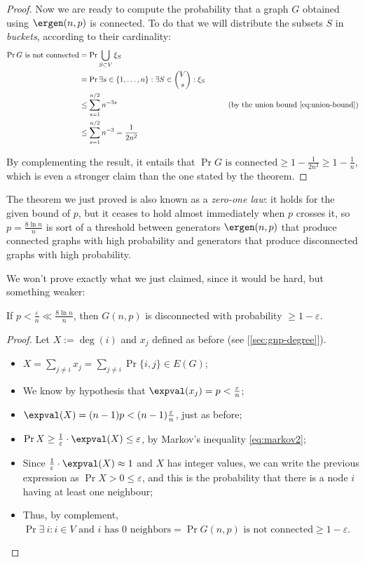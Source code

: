 \begin{proof}
    Now we are ready to compute the probability that a graph $G$ obtained using $\ergen(n, p)$ is connected. To do that we will distribute the subsets $S$ in \emph{buckets}, according to their cardinality:
    \begin{align*}
        \Pr{G \text{ is not connected}} &= \Pr{\bigcup_{S \subset V} \xi_S}         & \\
        &= \Pr{\exists s \in \{1, \ldots, n\} : \exists S \in \binom{V}{s} : \xi_S} & \\
        &\leq \sum_{s = 1}^{n/2} n^{-3s}                                            & \tag{by the union bound \ref{eq:union-bound}}\\
        &\leq \sum_{s = 1}^{n/2} n^{-3} = \frac{1}{2n^2}                            &
    \end{align*}
    
   By complementing the result, it entails that $\Pr{G \text{ is connected}} \geq 1 - \frac{1}{2n^2} \geq 1 - \frac{1}{n}$, which is even a stronger claim than the one stated by the theorem.
\end{proof}

The theorem we just proved is also known as a \emph{zero-one law}: it holds for the given bound of $p$, but it ceases to hold almost immediately when $p$ crosses it, so $p = \frac{8 \ln n}{n}$ is sort of a threshold between generators $\ergen(n, p)$ that produce connected graphs with high probability and generators that produce disconnected graphs with high probability.

We won't prove exactly what we just claimed, since it would be hard, but something weaker:
\begin{thm}
    If $p < \frac{\varepsilon}{n} \ll \frac{8 \ln n}{n}$, then $G(n, p)$ is disconnected with probability $\geq 1 - \varepsilon$.
\end{thm}

\begin{proof}
    Let $X := \deg(i)$ and $x_j$ defined as before (see [\ref{sec:gnp-degree}]).
    \begin{itemize}
        \item $X = \sum_{j \neq i} x_j = \sum_{j \neq i} \Pr{\{i, j\} \in E(G)}$;
        \item We know by hypothesis that $\expval(x_j) = p < \frac{\varepsilon}{n}$;
        \item $\expval(X) = (n - 1)p < (n - 1) \frac{\varepsilon}{n}$, just as before;
        \item $\Pr{X \geq \frac{1}{\varepsilon} \cdot \expval(X)} \leq \varepsilon$, by Markov's inequality \ref{eq:markov2};
        \item Since $\frac{1}{\varepsilon} \cdot \expval(X) \approx 1$ and $X$ has integer values, we can write the previous expression as $\Pr{X > 0} \leq \varepsilon$, and this is the probability that there is a node $i$ having at least one neighbour;
        \item Thus, by complement, $\Pr{\exists\ i : i \in V \text{ and } i \text{ has 0 neighbors}} = \Pr{G(n,p) \text{ is not connected}} \geq 1 - \varepsilon$.
    \end{itemize}
\end{proof}
    


